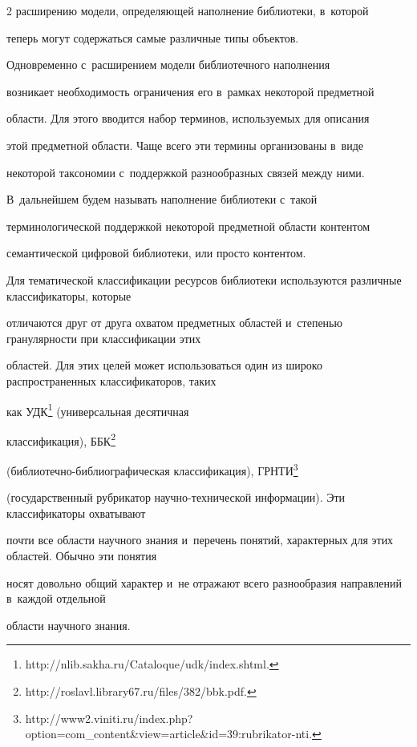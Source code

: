 \begin{multicols}{2}
расширению модели, определяющей наполнение библиотеки, в~которой 

теперь могут содержаться самые различные типы объектов. 

     

     Одновременно с~расширением модели биб\-ли\-о\-теч\-но\-го наполнения 

возникает необходимость ограничения его в~рамках некоторой предметной 

области. Для этого вводится набор терминов, используемых для описания 

этой предметной об\-ласти. Чаще всего эти термины организованы в~виде 

некоторой таксономии с~поддержкой разнообразных связей между ними. 

В~дальнейшем будем называть наполнение библиотеки с~такой 

терминологической поддержкой некоторой предметной области контентом 

семантической цифровой библиотеки, или просто контентом.

     

Для тематической классификации ресурсов биб\-ли\-о\-те\-ки используются различные классификаторы, которые 

отличаются друг от друга охватом предметных областей и~степенью гранулярности при классификации этих 

областей. Для этих целей может использоваться один из широко распространенных классификаторов, таких 

как УДК\footnote[1]{{\sf http://nlib.sakha.ru/Cataloque/udk/index.shtml.}} (универсальная десятичная 

классификация), ББК\footnote[2]{{\sf http://roslavl.library67.ru/files/382/bbk.pdf.}} 

(биб\-лио\-теч\-но-биб\-лио\-гра\-фи\-че\-ская классификация), ГРНТИ\footnote[3]{{\sf 

http://www2.viniti.ru/index.php?option=com\_content\&view=article\&id=39:rubrikator-nti.}} 

(государственный рубрикатор на\-уч\-но-тех\-ни\-че\-ской информации). Эти классификаторы охватывают 

почти все области научного знания и~перечень понятий, характерных для этих областей. Обычно эти понятия 

носят довольно общий характер и~не отражают всего разнообразия направлений в~каждой отдельной 

области научного знания.


\end{multicols}
